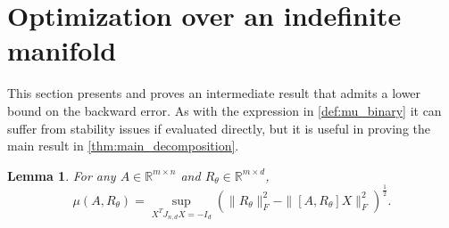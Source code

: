 \documentclass{article}
\newtheorem{lemma}{Lemma}
\newcommand{\ts}{^T}
\begin{document}
\section{Optimization over an indefinite manifold} \label{sec:indefinite_optimization}
This section presents and proves an intermediate result that admits a lower bound on the backward error. As with the expression in \cref{def:mu_binary} it can suffer from stability issues if evaluated directly, but it is useful in proving the main result in \cref{thm:main_decomposition}. 

\begin{lemma}\label{lemma:variational_first}
For any $A\in \mathbb{R}^{m\times n}$ and $R_\theta\in \mathbb{R}^{m\times d}$,
\begin{equation}\label{eqn:variational_first}
    \mu(A, R_\theta) = \sup_{X\ts J_{n,d}X = -I_d} \left(\|R_\theta\|_F^2 - \|[A, R_\theta]X\|_F^2\right)^{\frac{1}{2}}.
\end{equation}
\end{lemma}
\end{document}
